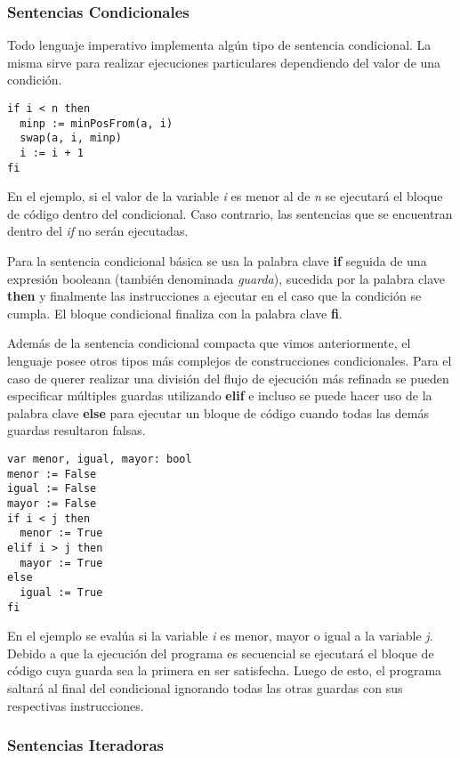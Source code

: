 \documentclass{article}
\begin{document}
\subsubsection{Sentencias Condicionales}

Todo lenguaje imperativo implementa algún tipo de sentencia condicional.
La misma sirve para realizar ejecuciones particulares dependiendo del valor de una condición.
\begin{lstlisting}
if i < n then
  minp := minPosFrom(a, i)
  swap(a, i, minp)
  i := i + 1
fi
\end{lstlisting}

En el ejemplo, si el valor de la variable \textit{i} es menor al de \textit{n} se ejecutará el bloque de código dentro del condicional.
Caso contrario, las sentencias que se encuentran dentro del \textit{if} no serán ejecutadas.

Para la sentencia condicional básica se usa la palabra clave \textbf{if} seguida de una expresión booleana (también denominada \textit{guarda}), sucedida por la palabra clave \textbf{then} y finalmente las instrucciones a ejecutar en el caso que la condición se cumpla.
El bloque condicional finaliza con la palabra clave \textbf{fi}.

Además de la sentencia condicional compacta que vimos anteriormente, el lenguaje posee otros tipos más complejos de construcciones condicionales.
Para el caso de querer realizar una división del flujo de ejecución más refinada se pueden especificar múltiples guardas utilizando \textbf{elif} e incluso se puede hacer uso de la palabra clave \textbf{else} para ejecutar un bloque de código cuando todas las demás guardas resultaron falsas.
\begin{lstlisting}
var menor, igual, mayor: bool
menor := False
igual := False
mayor := False
if i < j then
  menor := True
elif i > j then
  mayor := True
else
  igual := True
fi
\end{lstlisting}

En el ejemplo se evalúa si la variable \textit{i} es menor, mayor o igual a la variable \textit{j}.
Debido a que la ejecución del programa es secuencial se ejecutará el bloque de código cuya guarda sea la primera en ser satisfecha.
Luego de esto, el programa saltará al final del condicional ignorando todas las otras guardas con sus respectivas instrucciones.

\subsubsection{Sentencias Iteradoras}
\end{document}
